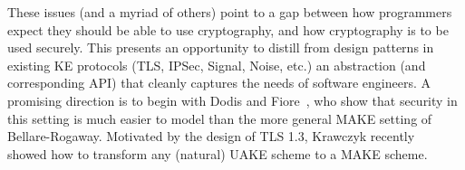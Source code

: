     These issues (and a myriad of others) point to a gap between how programmers
    expect they should be able to use cryptography, and how cryptography
    is to be used securely. This presents an opportunity to distill from design
    patterns in existing KE protocols (TLS, IPSec, Signal, Noise, etc.) an
    abstraction (and corresponding API) that cleanly captures the needs of
    software engineers.
    A promising direction is to begin with Dodis and
    Fiore~\cite{dodis2017unilateral}, who show that security in this setting is
    much easier to model than the more general MAKE setting of Bellare-Rogaway.
    Motivated by the design of TLS 1.3, Krawczyk
    recently~\cite{krawczyk2016unilateral-to-mutual} showed how to transform any
    (natural) UAKE scheme to a MAKE scheme.

\begin{task}
\end{task}
